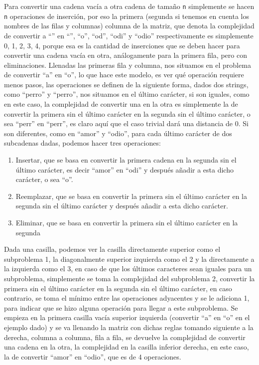 \documentclass[a4paper, 12pt]{article}
\begin{document}
Para convertir una cadena vacía a otra cadena de tamaño \texttt{n} simplemente se hacen \texttt{n}
operaciones de inserción, por eso la primera (segunda si tenemos en cuenta los
nombres de las filas y columnas) columna de la matriz, que denota la
complejidad de convertir a “” en “”, “o”, “od”, “odi” y “odio” respectivamente
es simplemente 0, 1, 2, 3, 4, porque esa es la cantidad de inserciones que se
deben hacer para convertir una cadena vacía en otra, análogamente para la
primera fila, pero con eliminaciones. Llenadas las primeras fila y columna,
nos situamos en el problema de convertir “a” en “o”, lo que hace este modelo,
es ver qué operación requiere menos pasos, las operaciones se definen de la
siguiente forma, dados dos strings, como “perro” y “perro”, nos situamos en el
último carácter, si son iguales, como en este caso, la complejidad de convertir
una en la otra es simplemente la de convertir la primera sin el último carácter en
la segunda sin el último carácter, o sea “perr” en “perr”, es claro aquí que el
caso trivial dará una distancia de 0. Si son diferentes, como en “amor” y “odio”,
para cada último carácter de dos subcadenas dadas, podemos hacer tres
operaciones:
\begin{enumerate}
    \item Insertar, que se basa en convertir la primera cadena en la segunda sin el
    último carácter, es decir “amor” en “odi” y después añadir a esta dicho carácter,
    o sea “o”.
    \item  Reemplazar, que se basa en convertir la primera sin el último carácter en la
    segunda sin el último carácter y después añadir a esta dicho carácter.
    \item Eliminar, que se basa en convertir la primera sin el último carácter en la
    segunda
\end{enumerate}

Dada una casilla, podemos ver la casilla directamente superior como el
subproblema 1, la diagonalmente superior izquierda como el 2 y la directamente
a la izquierda como el 3, en caso de que los últimos caracteres sean iguales para
un subproblema, simplemente se toma la complejidad del subproblema 2,
convertir la primera sin el último carácter en la segunda sin el último carácter,
en caso contrario, se toma el mínimo entre las operaciones adyacentes y se le
adiciona 1, para indicar que se hizo alguna operación para llegar a este
subproblema. Se empieza en la primera casilla vacía superior izquierda
(convertir “a” en “o” en el ejemplo dado) y se va llenando la matriz con dichas
reglas tomando siguiente a la derecha, columna a columna, fila a fila, se
devuelve la complejidad de convertir una cadena en la otra, la complejidad en la
casilla inferior derecha, en este caso, la de convertir “amor” en “odio”, que es de
4 operaciones.
\end{document}
